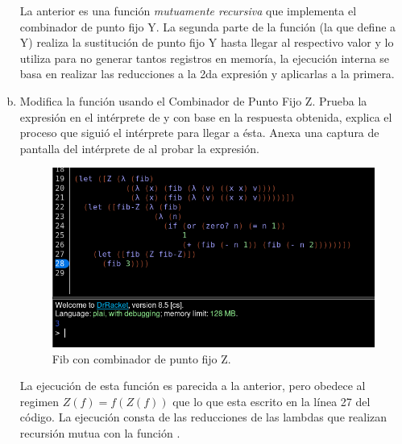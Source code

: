 \begin{enumerate}[a.]
La anterior es una función \textit{mutuamente recursiva} que implementa el combinador
de punto fijo Y.  La segunda parte de la función (la que define a Y) realiza la sustitución
de punto fijo Y hasta llegar al respectivo valor y lo utiliza para no generar tantos
registros en memoría, la ejecución interna se basa en realizar las reducciones a la 2da
expresión y aplicarlas a la primera.
\item Modifica la función usando el Combinador de Punto Fijo Z. Prueba la expresión en 
el intérprete de  y con base en la respuesta obtenida, explica el proceso que 
siguió el intérprete para llegar a ésta. Anexa una captura de pantalla del intérprete 
de  al probar la expresión.

\begin{figure}[h]
  \centering
  \includegraphics[scale=0.3]{./Fib-Z.png}
  \caption{Fib con combinador de punto fijo Z.}
\end{figure}

La ejecución de esta función es parecida a la anterior, pero obedece al regimen $Z(f) = f(Z(f))$
que lo que esta escrito en la línea 27 del código. La ejecución consta de las reducciones de las
lambdas que realizan recursión mutua con la función .
\end{enumerate}

